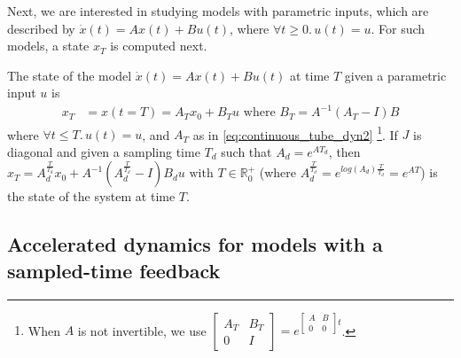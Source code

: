 \documentclass[sigconf]{llncs}
\newcommand{\mat}[1]{{#1}}
\renewcommand{\vec}[1]{{#1}}
\begin{document}
Next, we are interested in studying models with parametric inputs, which are
described by $\dot{\vec{x}}(t)=\mat{A}\vec{x}(t)+\mat{B}\vec{u}(t)$, where
$\forall t\geq 0.\,\vec{u}(t)=\vec{u}$.  For such models, a state $\vec{x}_T$
is computed next.
%
\begin{lemma}
%
The state of the model
$\dot{\vec{x}}(t)=\mat{A}\vec{x}(t)+\mat{B}\vec{u}(t)$ at time $T$ given a
parametric input $\vec{u}$ is
%
\begin{align}
\vec{x}_T&=\vec{x}(t=T)=\mat{A}_T\vec{x}_0 + \mat{B}_T\vec{u} \text{ where } \mat{B}_T=\mat{A}^{-1}(\mat{A}_T-\mat{I})\mat{B} 
\label{eq:continuous_tube_param}
\end{align}
%
where $\forall t \leq T.\, \vec{u}(t)=\vec{u}$, and $\mat{A}_T$ as in
\eqref{eq:continuous_tube_dyn2} \footnote{When $\mat{A}$ is not invertible,
we use $\left[\begin{array}{cc}\mat{A}_T&\mat{B}_T\\
0&\mat{I}\end{array}\right]=e^{\left[\begin{array}{cc}\mat{A}&\mat{B}\\0&0\end{array}\right]t}$.}. 
If $\mat{J}$ is diagonal and given a sampling time $T_d$ such that
$A_d=e^{\mat{A} T_d}$, then
$\vec{x}_T=A_d^{\frac{T}{T_d}}\vec{x}_0+\mat{A}^{-1}(\mat{A}_d^{\frac{T}{T_d}}-\mat{I})\mat{B}_d\vec{u}
\text{ with } T \in \mathbb{R}_0^+$ (where $\mat{A}_d^{\frac{T}{T_d}} =
e^{log(\mat{A}_d) \frac{T}{T_d}} = e^{\mat{A} T}$) is the state of the
system at time $T$.
%
\end{lemma}

\subsection{Accelerated dynamics for models with a sampled-time feedback}\label{sec:real_discrete_feedback_inputs}
\end{document}
